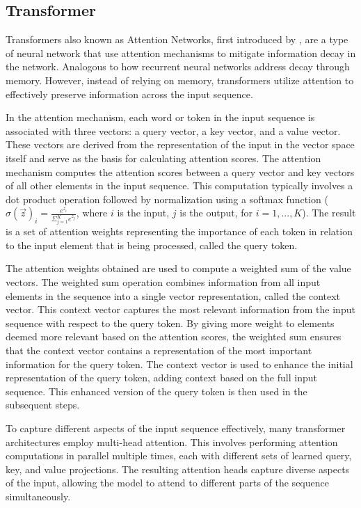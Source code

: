 \documentclass[conference]{IEEEtran}
\begin{document}
\subsection{Transformer} \label{Transformer}
Transformers also known as Attention Networks, first introduced by \cite{vaswani2017attention}, are a type of neural network that use attention mechanisms to mitigate information decay in the network. Analogous to how recurrent neural networks address decay through memory. However, instead of relying on memory, transformers utilize attention to effectively preserve information across the input sequence.

In the attention mechanism, each word or token in the input sequence is associated with three vectors: a query vector, a key vector, and a value vector. These vectors are derived from the representation of the input in the vector space itself and serve as the basis for calculating attention scores. The attention mechanism computes the attention scores between a query vector and key vectors of all other elements in the input sequence. This computation typically involves a dot product operation followed by normalization using a softmax function ($\sigma(\vec{z})_{i} = \frac{e^{z_{i}}}{\Sigma^{K}_{j=1}e^{z_{j}}}$, where $i$ is the input, $j$ is the output, for $i = 1, ..., K$). The result is a set of attention weights representing the importance of each token in relation to the input element that is being processed, called the query token. 

The attention weights obtained are used to compute a weighted sum of the value vectors. The weighted sum operation combines information from all input elements in the sequence into a single vector representation, called the context vector. This context vector captures the most relevant information from the input sequence with respect to the query token. By giving more weight to elements deemed more relevant based on the attention scores, the weighted sum ensures that the context vector contains a representation of the most important information for the query token. The context vector is used to enhance the initial representation of the query token, adding context based on the full input sequence. This enhanced version of the query token is then used in the subsequent steps.

To capture different aspects of the input sequence effectively, many transformer architectures employ multi-head attention. This involves performing attention computations in parallel multiple times, each with different sets of learned query, key, and value projections. The resulting attention heads capture diverse aspects of the input, allowing the model to attend to different parts of the sequence simultaneously.
\end{document}
